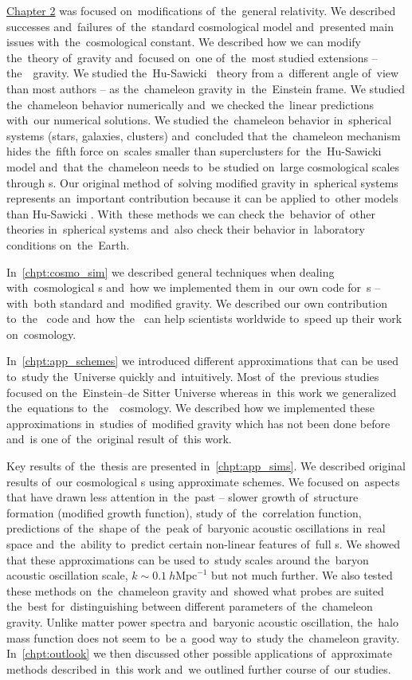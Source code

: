 \hyperref[chpt:de_mg]{Chapter 2} was focused on~modifications of~the~general relativity. We described successes and~failures of~the~standard cosmological model and~presented main issues with~the~cosmological constant. We described how we can modify the~theory of~gravity and~focused on~one of~the~most studied extensions -- the~\fR\ gravity. We studied the~Hu-Sawicki \fR\ theory from a~different angle of~view than most authors -- as the~chameleon gravity in~the~Einstein frame. We studied the~chameleon behavior numerically and~we checked the~linear predictions with~our numerical solutions. We studied the~chameleon behavior in~spherical systems (stars, galaxies, clusters) and~concluded that the~chameleon mechanism hides the~fifth force on~scales smaller than superclusters for~the~Hu-Sawicki model and~that the~chameleon needs to~be studied on~large cosmological scales through \nbodysim s. Our original method of~solving modified gravity in~spherical systems represents an~important contribution because it can be applied to~other models than Hu-Sawicki \fR. With~these methods we can check the~behavior of~other theories in~spherical systems and~also check their behavior in~laboratory conditions on~the~Earth.

In~\autoref{chpt:cosmo_sim} we described general techniques when dealing with~cosmological \nbodysim s and~how we implemented them in~our own code for~\nbodysim s -- with~both standard and~modified gravity. We described our own contribution to~the~ code and~how the~ can help scientists worldwide to~speed up their work on~cosmology.

In~\autoref{chpt:app_schemes} we introduced different approximations that can be used to~study the~Universe quickly and~intuitively. Most of~the~previous studies focused on the~Einstein--de Sitter Universe whereas in~this work we generalized the~equations to~the~\LCDM\ cosmology. We described how we implemented these approximations in~studies of~modified gravity which has not been done before and~is one of~the~original result of~this work.

Key results of~the~thesis are presented in~\autoref{chpt:app_sims}. We described original results of~our cosmological \nbodysim s using approximate schemes. We focused on~aspects that have drawn less attention in~the~past -- slower growth of~structure formation (modified growth function), study of~the~correlation function, predictions of~the~shape of~the~peak of~baryonic acoustic oscillations in~real space and~the~ability to~predict certain non-linear features of~full \nbodysim s. We showed that these approximations can be used to~study scales around the~baryon acoustic oscillation scale, $k\sim 0.1~h\text{Mpc}^{-1}$ but not much further. We also tested these methods on~the~chameleon gravity and~showed what probes are suited the~best for~distinguishing between different parameters of~the~chameleon gravity. Unlike matter power spectra and~baryonic acoustic oscillation, the~halo mass function does not seem to~be a~good way to~study the~chameleon gravity. In~\autoref{chpt:outlook} we then discussed other possible applications of~approximate methods described in~this work and~we outlined further course of~our studies.

